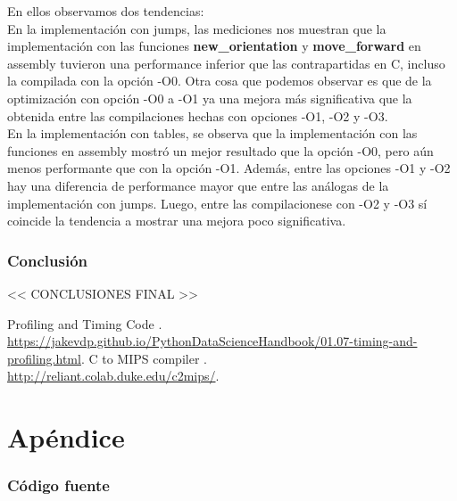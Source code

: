 \documentclass[a4paper, 10pt, twoside, notitlepage]{article}
\begin{document}
\newpage
En ellos observamos dos tendencias:\\
En la implementación con jumps, las mediciones nos muestran que la implementación con las funciones \textbf{new\_orientation} y \textbf{move\_forward} en assembly tuvieron una performance inferior que las contrapartidas en C, incluso la compilada con la opción -O0.
Otra cosa que podemos observar es que de la optimización con opción -O0 a -O1 ya una mejora más significativa que la obtenida entre las compilaciones hechas con opciones -O1, -O2 y -O3.\\
En la implementación con tables, se observa que la implementación con las funciones en assembly mostró un mejor resultado que la opción -O0, pero aún menos performante que con la opción -O1. Además, entre las opciones -O1 y -O2 hay una diferencia de performance mayor que entre las análogas de la implementación con jumps. Luego, entre las compilacionese con -O2 y -O3 sí coincide la tendencia a mostrar una mejora poco significativa.

\newpage

\section{Conclusión}
<< CONCLUSIONES FINAL >> 


\vspace{.5cm}
\begin{thebibliography}{5}
 \bibitem{} Profiling and Timing Code
.\\ \url{https://jakevdp.github.io/PythonDataScienceHandbook/01.07-timing-and-profiling.html}.
 \bibitem{} C to MIPS compiler
.\\ \url{http://reliant.colab.duke.edu/c2mips/}.

\end{thebibliography}

\clearpage

\part{Apéndice}
\appendix

\normalsize
\section{Código fuente}\label{sec:codigofuente}
\end{document}

